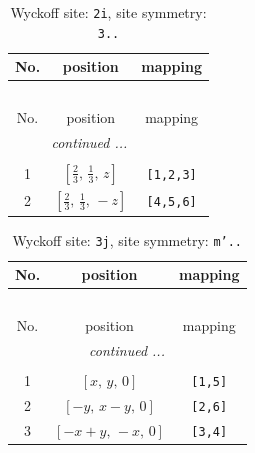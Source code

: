 \documentclass[fleqn,8pt]{jsarticle}
\begin{document}
\renewcommand{\arraystretch}{1.2}
\begin{longtable}{ccc}
\caption{Wyckoff site: {\tt 2i}, site symmetry: {\tt 3..}}
 \\
 \hline \hline
No. & position & mapping \\ \hline \endfirsthead

\multicolumn{2}{l}{\tablename\ \thetable{}} \\
 \hline \hline
No. & position & mapping \\ \hline \endhead

 \hline \hline
\multicolumn{2}{r}{\footnotesize\it continued ...} \\ \endfoot

 \hline \hline
\multicolumn{2}{r}{} \\ \endlastfoot

1 & $\left[ \frac{2}{3},\, \frac{1}{3},\, z \right]$ & {\tt [1,2,3]} \\ \hline
2 & $\left[ \frac{2}{3},\, \frac{1}{3},\, - z \right]$ & {\tt [4,5,6]} \\
\end{longtable}
\renewcommand{\arraystretch}{1.2}
\begin{longtable}{ccc}
\caption{Wyckoff site: {\tt 3j}, site symmetry: {\tt m'..}}
 \\
 \hline \hline
No. & position & mapping \\ \hline \endfirsthead

\multicolumn{2}{l}{\tablename\ \thetable{}} \\
 \hline \hline
No. & position & mapping \\ \hline \endhead

 \hline \hline
\multicolumn{2}{r}{\footnotesize\it continued ...} \\ \endfoot

 \hline \hline
\multicolumn{2}{r}{} \\ \endlastfoot

1 & $\left[ x,\, y,\, 0 \right]$ & {\tt [1,5]} \\ \hline
2 & $\left[ - y,\, x - y,\, 0 \right]$ & {\tt [2,6]} \\ \hline
3 & $\left[ - x + y,\, - x,\, 0 \right]$ & {\tt [3,4]} \\
\end{longtable}
\renewcommand{\arraystretch}{1.2}
\end{document}
